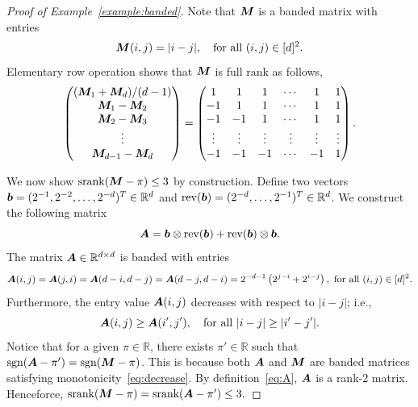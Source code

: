 \documentclass[twoside,11pt]{article}
\theoremstyle{plain}
\theoremstyle{definition}
\def\sign{\textup{sgn}}
\def\srank{\textup{srank}}
\begin{document}
\begin{proof}[Proof of Example~\ref{example:banded}]
Note that $\bm M$ is a banded matrix with entries
\[
\bm M(i,j)={|i-j|}, \quad \text{for all }(i,j)\in[d]^2.
\]
Elementary row operation shows that $\bm M$ is full rank as follows,
\begin{align}
\begin{pmatrix}
(\bm M_1+\bm M_d)/(d-1)\\
\bm M_1-\bm M_2\\
\bm M_2-\bm M_3\\
\vdots\\
\bm M_{d-1}-\bm M_{d}
\end{pmatrix} = 
\begin{pmatrix}
1&1&1&\cdots&1&1\\
-1&1&1&\cdots&1&1\\
-1&-1&1&\cdots&1&1\\
\vdots & \vdots & \vdots & \vdots & \vdots & \vdots\\
-1&-1&-1&\cdots&-1&1
\end{pmatrix}.
\end{align}

We now show $\srank(\mM-\pi)\leq 3$ by construction. Define two vectors $\bm{b}=(2^{-1},2^{-2},\ldots,2^{-d})^T\in\mathbb{R}^d$ and $\text{rev}(\bm{b})=(2^{-d},\ldots,2^{-1})^T\in\mathbb{R}^d$. We construct the following matrix
\begin{equation}\label{eq:A}
\bm A=\bm{b}\otimes\text{rev}(\bm{b})+\text{rev}(\bm{b})\otimes\bm{b}.
\end{equation}
The matrix $\bm A\in\mathbb{R}^{d\times d}$ is banded with entries
\[
\mA(i,j)=\mA(j,i)=\mA(d-i,d-j)=\mA(d-j,d-i)=2^{-d-1}\left(2^{j-i}+2^{i-j}\right),\ \text{for all }(i,j)\in[d]^2.
\] 
Furthermore, the entry value $\bm A(i,j)$ decreases with respect to $|i-j|$; i.e., 
\begin{equation}\label{eq:decrease}
\bm A(i,j) \geq \bm A(i',j'), \quad \text{for all }|i-j|\geq |i'-j'|.
\end{equation}
Notice that for a given $\pi\in\mathbb{R}$, there exists $\pi'\in\mathbb{R}$ such that $\sign(\mA-\pi')=\sign(\mM-\pi)$. This is because both $\bm A$ and $\bm M$ are banded matrices satisfying monotonicity~\eqref{eq:decrease}. By definition~\eqref{eq:A}, $\bm A$ is a rank-2 matrix. Henceforce, $\srank(\mM-\pi)=\srank(\mA-\pi')\leq 3.$
\end{proof}
\end{document}
